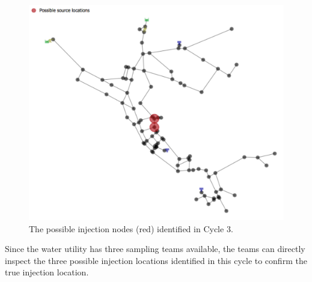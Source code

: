 \begin{figure}[!ht]
\begin{center}
\includegraphics[scale=0.6]{graphics/inversion_cs_cycle3.pdf}
\caption{The possible injection nodes (red) identified in Cycle 3.}
\label{fig:case_study_cycle3}
\end{center}
\end{figure}

Since the water utility has three sampling teams available, the teams can directly inspect the three possible injection locations 
identified in this cycle to confirm the true injection location.  
